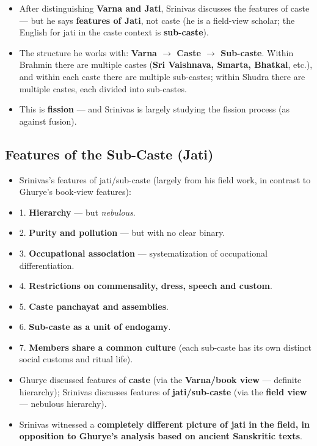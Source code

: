 \begin{KeyConcept}
\begin{itemize}
\item After distinguishing \textbf{Varna and Jati}, Srinivas discusses the features of caste --- but he says \textbf{features of Jati}, not caste (he is a field-view scholar; the English for jati in the caste context is \textbf{sub-caste}).
\item The structure he works with: \textbf{Varna $\rightarrow$ Caste $\rightarrow$ Sub-caste}. Within Brahmin there are multiple castes (\textbf{Sri Vaishnava, Smarta, Bhatkal}, etc.), and within each caste there are multiple sub-castes; within Shudra there are multiple castes, each divided into sub-castes.
\item This is \textbf{fission} --- and Srinivas is largely studying the fission process (as against fusion).
\end{itemize}
\end{KeyConcept}

\subsection{Features of the Sub-Caste (Jati)}

\begin{KeyConcept}
\begin{itemize}
\item Srinivas's features of jati/sub-caste (largely from his field work, in contrast to Ghurye's book-view features):
\item 1. \textbf{Hierarchy} --- but \emph{nebulous}.
\item 2. \textbf{Purity and pollution} --- but with no clear binary.
\item 3. \textbf{Occupational association} --- systematization of occupational differentiation.
\item 4. \textbf{Restrictions on commensality, dress, speech and custom}.
\item 5. \textbf{Caste panchayat and assemblies}.
\item 6. \textbf{Sub-caste as a unit of endogamy}.
\item 7. \textbf{Members share a common culture} (each sub-caste has its own distinct social customs and ritual life).
\end{itemize}
\end{KeyConcept}

\begin{ComparisonBox}
\begin{itemize}
\item Ghurye discussed features of \textbf{caste} (via the \textbf{Varna/book view} --- definite hierarchy); Srinivas discusses features of \textbf{jati/sub-caste} (via the \textbf{field view} --- nebulous hierarchy).
\item Srinivas witnessed a \textbf{completely different picture of jati in the field, in opposition to Ghurye's analysis based on ancient Sanskritic texts}.
\end{itemize}
\end{ComparisonBox}

